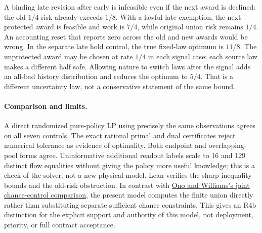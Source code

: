 \documentclass[11pt]{article}
\begin{document}
A binding late revision after early is infeasible even if the next award is declined: the old $1/4$ risk already exceeds $1/8$. With a lawful late exemption, the next protected award is feasible and work is $7/4$, while original union risk remains $1/4$. An accounting reset that reports zero across the old and new awards would be wrong. In the separate late hold control, the true fixed-law optimum is $11/8$. The unprotected award may be chosen at rate $1/4$ in each signal case; each source law makes a different half safe. Allowing nature to switch laws after the signal adds an all-bad history distribution and reduces the optimum to $5/4$. That is a different uncertainty law, not a conservative statement of the same bound.

\paragraph{Comparison and limits.}
A direct randomized pure-policy LP using precisely the same observations agrees on all seven controls. The exact rational primal and dual certificates reject numerical tolerance as evidence of optimality. Both endpoint and overlapping-pool forms agree. Uninformative additional readout labels scale to 16 and 129 distinct flow equalities without giving the policy more useful knowledge; this is a check of the solver, not a new physical model. Lean verifies the sharp inequality bounds and the old-risk obstruction. In contrast with \href{https://groups.csail.mit.edu/mers/old-site/papers/ono_cdc10.pdf}{Ono and Williams's joint chance-control comparison}, the present model computes the finite union directly rather than substituting separate sufficient chance constraints. This gives an R4b distinction for the explicit support and authority of this model, not deployment, priority, or full contract acceptance.
\end{document}
